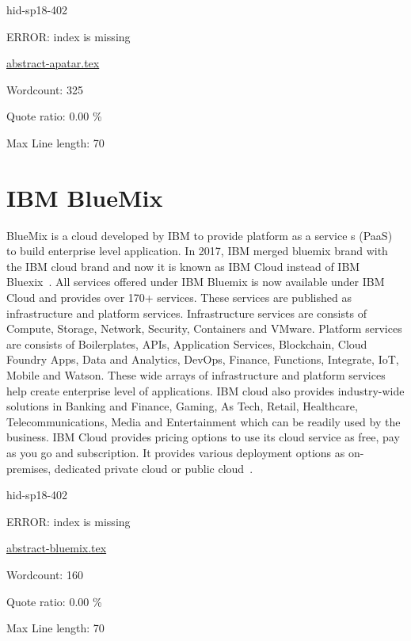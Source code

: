 \begin{IU}

hid-sp18-402

ERROR: index is missing

\href{https://github.com/cloudmesh-community/hid-sp18-402/blob/master//technology/abstract-apatar.tex}{abstract-apatar.tex}

 

Wordcount: 325


Quote ratio: 0.00 \%
 
Max Line length: 70
\end{IU}

\section{IBM BlueMix}
BlueMix is a cloud developed by IBM to provide platform as a service
s (PaaS) to build enterprise level application. In 2017, IBM merged
bluemix brand with the IBM cloud brand and now it is known as IBM
Cloud instead of IBM Bluexix~\cite{hid-sp18-402-www-ibm-blog}. All
services offered under IBM Bluemix is now available under IBM Cloud
and provides over 170+ services. These services are published as
infrastructure and platform services. Infrastructure services are
consists of Compute, Storage, Network, Security, Containers and
VMware. Platform services are consists of Boilerplates, APIs,
Application Services, Blockchain, Cloud Foundry Apps, Data and
Analytics, DevOps, Finance, Functions, Integrate, IoT, Mobile and
Watson. These wide arrays of infrastructure and platform services help
create enterprise level of applications. IBM cloud also provides
industry-wide solutions in Banking and Finance, Gaming, As Tech,
Retail, Healthcare, Telecommunications, Media and Entertainment which
can be readily used by the business. IBM Cloud provides pricing
options to use its cloud service as free, pay as you go and
subscription. It provides various deployment options as on-premises,
dedicated private cloud or public cloud~\cite{hid-sp18-402-www-ibm}.


\begin{IU}

hid-sp18-402

ERROR: index is missing

\href{https://github.com/cloudmesh-community/hid-sp18-402/blob/master//technology/abstract-bluemix.tex}{abstract-bluemix.tex}

 

Wordcount: 160


Quote ratio: 0.00 \%
 
Max Line length: 70
\end{IU}

